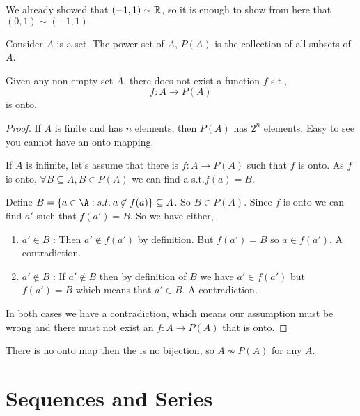 \begin{remark}
    We already showed that $(-1,1) \sim \mathbb{R}$, so it is enough to show from here that  $(0, 1) \sim (-1, 1)$
\end{remark}


\begin{definition}
    Consider $A$ is a set. The power set of $A$, $P(A)$ is the collection of all subsets of  $A$.
\end{definition}

\begin{theorem}
    Given any non-empty set $A$, there does not exist a function $f$ s.t.,  
    $$ f: A \to P(A) $$  is onto.
\end{theorem}

\begin{proof}
If $A$ is finite and has $n$ elements, then $P(A)$ has  $2^{n}$ elements. Easy to see you cannot have an onto mapping.

If $A$ is infinite, let's assume that  there is $f:A \to P(A)$ such that $f$ is onto.
As $f$ is onto, $\forall B \subseteq A, B \in P(A)$ we can find  a s.t.$f(a) = B$.

\vspace{1em}

Define $B = \{a \in \A: s.t. \: a \not \in f(a) \} \subseteq A$. So $B \in P(A)$. Since $f$ is onto we can find $a'$ such that $f(a') = B$. So we have either,

\begin{enumerate}
    \item $a' \in B$ : Then $a' \not \in f(a')$ by definition. But  $f(a') = B$ so  $a \in f(a')$. A contradiction.
    \item $a' \not \in B$ : If $a' \not \in B$ then by definition of  $B$  we have $a'  \in f(a')$ but $f(a') = B$ which means that  $a' \in B$. A contradiction.
\end{enumerate}

In both cases we have a contradiction, which means our assumption must be wrong and there must not exist an $f: A \to P(A)$ that is onto.

\end{proof}


\begin{remark}
    There is no onto map then the is no bijection, so $A \not \sim P(A)$ for any  $A$.
\end{remark}


\chapter{Sequences and Series}
